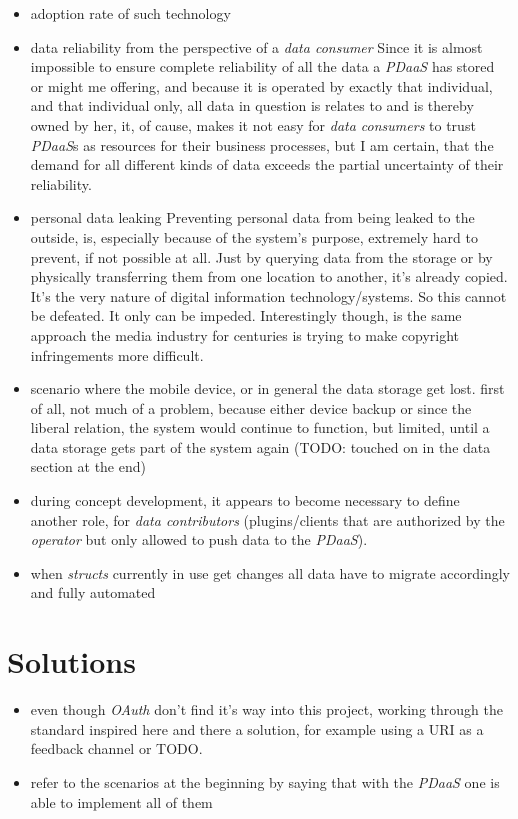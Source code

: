 \documentclass[12pt,english,a4paper,titlepage,cleardoublepage=empty,dottedtoc]{report}
\begin{document}
\begin{itemize}
\item
  adoption rate of such technology
\item
  data reliability from the perspective of a \emph{data consumer} Since
  it is almost impossible to ensure complete reliability of all the data
  a \emph{PDaaS} has stored or might me offering, and because it is
  operated by exactly that individual, and that individual only, all
  data in question is relates to and is thereby owned by her, it, of
  cause, makes it not easy for \emph{data consumers} to trust
  \emph{PDaaS}s as resources for their business processes, but I am
  certain, that the demand for all different kinds of data exceeds the
  partial uncertainty of their reliability.
\item
  personal data leaking Preventing personal data from being leaked to
  the outside, is, especially because of the system's purpose, extremely
  hard to prevent, if not possible at all. Just by querying data from
  the storage or by physically transferring them from one location to
  another, it's already copied. It's the very nature of digital
  information technology/systems. So this cannot be defeated. It only
  can be impeded. Interestingly though, is the same approach the media
  industry for centuries is trying to make copyright infringements more
  difficult.
\item
  scenario where the mobile device, or in general the data storage get
  lost. first of all, not much of a problem, because either device
  backup or since the liberal relation, the system would continue to
  function, but limited, until a data storage gets part of the system
  again (TODO: touched on in the data section at the end)
\item
  during concept development, it appears to become necessary to define
  another role, for \emph{data contributors} (plugins/clients that are
  authorized by the \emph{operator} but only allowed to push data to the
  \emph{PDaaS}).
\item
  when \emph{structs} currently in use get changes all data have to
  migrate accordingly and fully automated
\end{itemize}

\section{Solutions}\label{solutions}

\begin{itemize}
\item
  even though \emph{OAuth} don't find it's way into this project,
  working through the standard inspired here and there a solution, for
  example using a URI as a feedback channel or TODO.
\item
  refer to the scenarios at the beginning by saying that with the
  \emph{PDaaS} one is able to implement all of them
\end{itemize}
\end{document}
